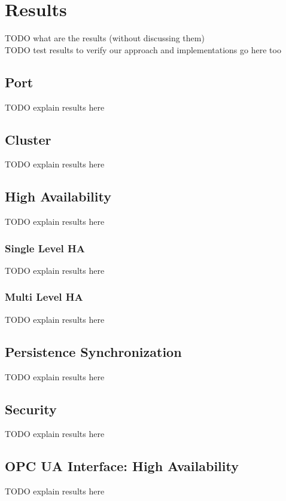 \chapter{Results}\label{ch:res}
TODO what are the results (without discussing them)\\
TODO test results to verify our approach and implementations go here too\\

\section{Port}\label{sec:res:port}
TODO explain results here\\


\section{Cluster}\label{sec:res:cluster}
TODO explain results here\\


\section{High Availability}\label{sec:res:ha}
TODO explain results here\\

\subsection*{Single Level HA}\label{sec:res:sl-ha}
TODO explain results here\\

\subsection*{Multi Level HA}\label{sec:res:ml-ha}
TODO explain results here\\

\section{Persistence Synchronization}\label{sec:res:psync}
TODO explain results here\\

\section{Security}\label{sec:res:security}
TODO explain results here\\

\section{OPC UA Interface: High Availability}\label{sec:res:opc-ua}
TODO explain results here\\

